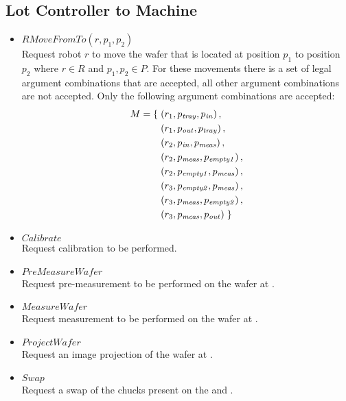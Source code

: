 \subsection{Lot Controller to Machine}
\begin{itemize}
    \item $\mathit{RMoveFromTo}(r, p_1, p_2)$ \\
        Request robot $r$ to move the wafer that is located at position $p_1$ to position $p_2$ where $r \in R$ and $p_1, p_2 \in P$.
        For these movements there is a set of legal argument combinations that are accepted, all other argument combinations are not accepted.
        Only the following argument combinations are accepted:
        \begin{equation}\label{eq:valid-moves}
            \begin{split}
                M = \left\{\vphantom{\left(p_\mathit{tray}\right)}\right.
                    & \left(r_1, p_\mathit{tray},   p_\mathit{in}     \right), \\
                    & \left(r_1, p_\mathit{out},    p_\mathit{tray}   \right), \\
                    & \left(r_2, p_\mathit{in},     p_\mathit{meas}   \right), \\
                    & \left(r_2, p_\mathit{meas},   p_\mathit{empty1} \right), \\
                    & \left(r_2, p_\mathit{empty1}, p_\mathit{meas}   \right), \\
                    & \left(r_3, p_\mathit{empty2}, p_\mathit{meas}   \right), \\
                    & \left(r_3, p_\mathit{meas},   p_\mathit{empty2} \right), \\
                    & \left(r_3, p_\mathit{meas},   p_\mathit{out}    \right)
                        \left.\vphantom{\left(p_\mathit{tray}\right)}\right\} \\
            \end{split}
        \end{equation}

    \item $\mathit{Calibrate}$ \\
    Request calibration to be performed.
   
    \item $\mathit{PreMeasureWafer}$ \\
    Request pre-measurement to be performed on the wafer at \chuckIn.
   
    \item $\mathit{MeasureWafer}$ \\
    Request measurement to be performed on the wafer at \chuckMeas.
 
    \item $\mathit{ProjectWafer}$ \\
    Request an image projection of the wafer at \chuckProj.
 
    \item $\mathit{Swap}$ \\
    Request a swap of the chucks present on the \chuckMeas and \chuckProj.
\end{itemize}

